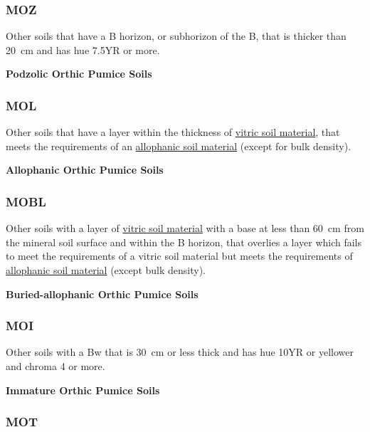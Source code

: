 \documentclass[
  letterpaper,
  DIV=11,
  numbers=noendperiod]{scrreprt}
\begin{document}
\hypertarget{sec-key-MOZ}{%
\subsubsection{\texorpdfstring{\textbf{MOZ}}{MOZ}}\label{sec-key-MOZ}}

Other soils that have a B horizon, or subhorizon of the B, that is
thicker than 20~cm and has hue 7.5YR or more.

\textbf{Podzolic Orthic Pumice Soils}

\hypertarget{sec-key-MOL}{%
\subsubsection{\texorpdfstring{\textbf{MOL}}{MOL}}\label{sec-key-MOL}}

Other soils that have a layer within the thickness of
\protect\hyperlink{sec-diag-vitr}{vitric soil material}, that meets the
requirements of an \protect\hyperlink{sec-diag-alloph}{allophanic soil
material} (except for bulk density).

\textbf{Allophanic Orthic Pumice Soils}

\hypertarget{sec-key-MOBL}{%
\subsubsection{\texorpdfstring{\textbf{MOBL}}{MOBL}}\label{sec-key-MOBL}}

Other soils with a layer of \protect\hyperlink{sec-diag-vitr}{vitric
soil material} with a base at less than 60~cm from the mineral soil
surface and within the B horizon, that overlies a layer which fails to
meet the requirements of a vitric soil material but meets the
requirements of \protect\hyperlink{sec-diag-alloph}{allophanic soil
material} (except bulk density).

\textbf{Buried-allophanic Orthic Pumice Soils}

\hypertarget{sec-key-MOI}{%
\subsubsection{\texorpdfstring{\textbf{MOI}}{MOI}}\label{sec-key-MOI}}

Other soils with a Bw that is 30~cm or less thick and has hue 10YR or
yellower and chroma 4 or more.

\textbf{Immature Orthic Pumice Soils}

\hypertarget{sec-key-MOT}{%
\subsubsection{\texorpdfstring{\textbf{MOT}}{MOT}}\label{sec-key-MOT}}
\end{document}
